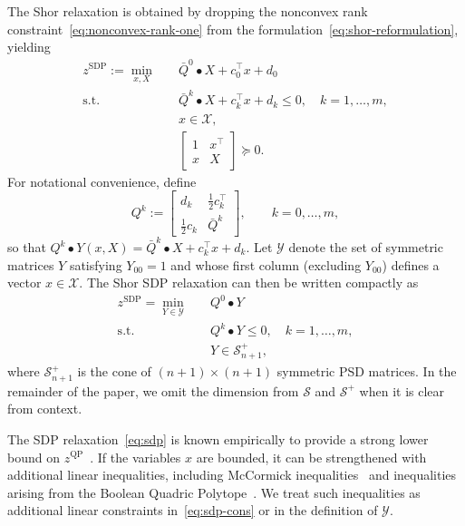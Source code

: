 \documentclass[twoside]{article}
\newcommand{\matip}[2]{#1 \bullet #2}
\newcommand{\citep}[1]{\cite{#1}}
\begin{document}
	The Shor relaxation is obtained by dropping the nonconvex rank constraint~\eqref{eq:nonconvex-rank-one} from the formulation~\eqref{eq:shor-reformulation}, yielding
	\begin{subequations}
		\label{eq:shor-relaxation-xX}
		\begin{align}
			z^{\mathrm{SDP}} := \min_{x,X} \quad & \matip{\bar Q^0}{X}+c_0^\top x + d_0\\
			\text{s.t.}\quad & \matip{\bar Q^k}{X} + c_k^\top x + d_k \leq 0, \quad k=1,\ldots,m,\\
			& x \in \mathcal X,\\
			& \begin{bmatrix} 1 & x^\top\\ x & X \end{bmatrix} \succeq 0.
		\end{align}
	\end{subequations}
	For notational convenience, define
	\begin{equation}
		\label{eq:Q-definition}
		Q^k:= \begin{bmatrix}
			d_k & \tfrac12 c_k^\top\\
			\tfrac12 c_k & \bar Q^k
		\end{bmatrix}, \qquad k=0,\ldots,m,
	\end{equation}
	so that $\matip{Q^k}{Y(x,X)} = \matip{\bar Q^k}{X}+c_k^\top x + d_k$. 
	Let $\mathcal Y$ denote the set of symmetric matrices $Y$ satisfying $Y_{00}=1$ and whose first column (excluding $Y_{00}$) defines a vector $x\in\mathcal X$. The Shor SDP relaxation can then be written compactly as
	\begin{subequations}
		\label{eq:sdp}
		\begin{align}
			z^{\mathrm{SDP}} = \min_{Y \in \mathcal Y} \quad & \matip{Q^0}{Y} \label{eq:sdp-obj}\\
			\text{s.t.} \quad & \matip{Q^k}{Y} \leq 0, \quad k=1,\ldots,m, \label{eq:sdp-cons}\\
			& Y \in \mathcal S^+_{n+1}, \label{eq:sdp-psd}
		\end{align}
	\end{subequations}
	where $\mathcal S^+_{n+1}$ is the cone of $(n+1)\times(n+1)$ symmetric PSD matrices.  In the remainder of the paper, we omit the dimension from $\mathcal S$ and $\mathcal S^+$ when it is clear from context.
	
	The SDP relaxation~\eqref{eq:sdp} is known empirically to provide a strong lower bound on $z^{\mathrm{QP}}$~\citep{anstreicher:09}. If the variables $x$ are bounded, it can be strengthened with additional linear inequalities, including McCormick inequalities~\citep{mccormick:76} and inequalities arising from the Boolean Quadric Polytope~\citep{burer.letchford:09}. We treat such inequalities as additional linear constraints in~\eqref{eq:sdp-cons} or in the definition of $\mathcal Y$.
	
\end{document}
